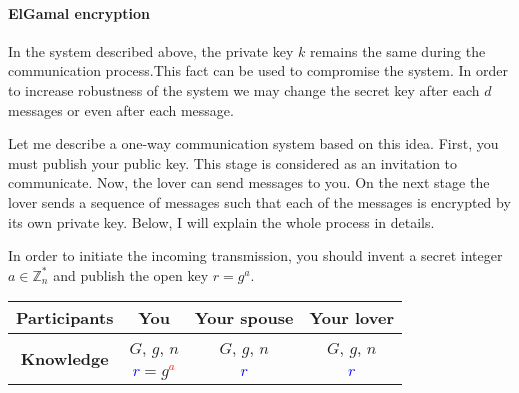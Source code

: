 \paragraph{ElGamal encryption}

In the system described above, the private key $k$ remains the same during the communication process.This fact can be used to compromise the system. In order to increase robustness of the system we may change the secret key after each $d$ messages or even after each message.

Let me describe a one-way communication system based on this idea. First, you must publish your public key. This stage is considered as an invitation to communicate. Now, the lover can send messages to you. On the next stage the lover sends a sequence of messages such that each of the messages is encrypted by its own private key. Below, I will explain the whole process in details.

In order to initiate the incoming transmission, you should invent a secret integer $a\in \mathbb Z_n^*$ and publish the open key $r = g^a$.
\begin{center}
\begin{tabular}{|c|c|c|c|}
\hline
{\bf Participants}&{You}&{Your spouse}&{Your lover}\\
\hline
\multirow{2}{*}{\bf Knowledge}&{\textcolor{OliveGreen}{$G$}, \textcolor{OliveGreen}{$g$}, \textcolor{OliveGreen}{$n$}}&{\textcolor{OliveGreen}{$G$}, \textcolor{OliveGreen}{$g$}, \textcolor{OliveGreen}{$n$}}&{\textcolor{OliveGreen}{$G$}, \textcolor{OliveGreen}{$g$}, \textcolor{OliveGreen}{$n$}}\\
{}&{ \textcolor{blue}{$r$}$=$\textcolor{OliveGreen}{$ g$}\textcolor{red}{${}^a$}}&{\textcolor{blue}{$r$}}&{\textcolor{blue}{$r$}}\\
\hline
\end{tabular}
\end{center}

